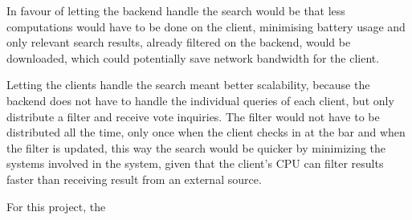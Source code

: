 In favour of letting the backend handle the search would be that less computations would have to be done on the client, minimising battery usage and only relevant search results, already filtered on the backend, would be downloaded, which could potentially save network bandwidth for the client.

Letting the clients handle the search meant better scalability, because the backend does not have to handle the individual queries of each client, but only distribute a filter and receive vote inquiries. The filter would not have to be distributed all the time, only once when the client checks in at the bar and when the filter is updated, this way the search would be quicker by minimizing the systems involved in the system, given that the client's CPU can filter results faster than receiving result from an external source.

For this project, the
